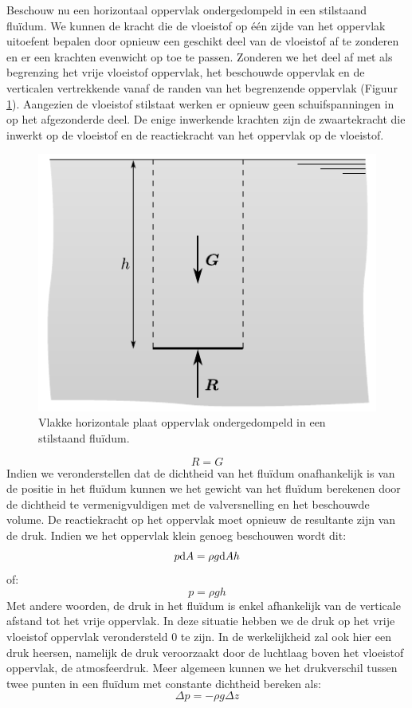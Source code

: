 Beschouw nu een horizontaal oppervlak ondergedompeld in een stilstaand fluïdum. We kunnen de kracht die de vloeistof op \'e\'en zijde van het oppervlak uitoefent bepalen door opnieuw een geschikt deel van de vloeistof af te zonderen en er een krachten evenwicht op toe te passen. Zonderen we het deel af met als begrenzing het vrije vloeistof oppervlak, het beschouwde oppervlak en de verticalen vertrekkende vanaf de randen van het begrenzende oppervlak (Figuur \ref{fig:oppervlak_in_stilstaande_vloeistof}). Aangezien de vloeistof stilstaat werken er opnieuw geen schuifspanningen in op het afgezonderde deel. De enige inwerkende krachten zijn de zwaartekracht die inwerkt op de vloeistof en de reactiekracht van het oppervlak op de vloeistof.
\begin{figure}[htb]
	\centering
	\includegraphics{fig/hydrostatica/oppervlak_in_stilstaande_vloeistof}
	\caption{Vlakke horizontale plaat oppervlak ondergedompeld in een stilstaand fluïdum.}
	\label{fig:oppervlak_in_stilstaande_vloeistof}
\end{figure}
\begin{equation}
	 R = G
\end{equation}
Indien we veronderstellen dat de dichtheid van het fluïdum onafhankelijk is van de positie in het fluïdum kunnen we het gewicht van het fluïdum berekenen door de dichtheid te vermenigvuldigen met de valversnelling en het beschouwde volume. De reactiekracht op het oppervlak moet opnieuw de resultante zijn van de druk. Indien we het oppervlak klein genoeg beschouwen wordt dit:
\begin{equation}
	 p \mathrm{d} A = \rho g \mathrm{d} A h
\end{equation}
of:
\begin{equation}
	 p = \rho g h
\end{equation}
Met andere woorden, de druk in het fluïdum is enkel afhankelijk van de verticale afstand tot het vrije oppervlak. In deze situatie hebben we de druk op het vrije vloeistof oppervlak verondersteld 0 te zijn. In de werkelijkheid zal ook hier een druk heersen, namelijk de druk veroorzaakt door de luchtlaag boven het vloeistof oppervlak, de atmosfeerdruk. Meer algemeen kunnen we het drukverschil tussen twee punten in een fluïdum met constante dichtheid bereken als:
\begin{equation}
	\Delta p = -\rho g \Delta z
\end{equation}

